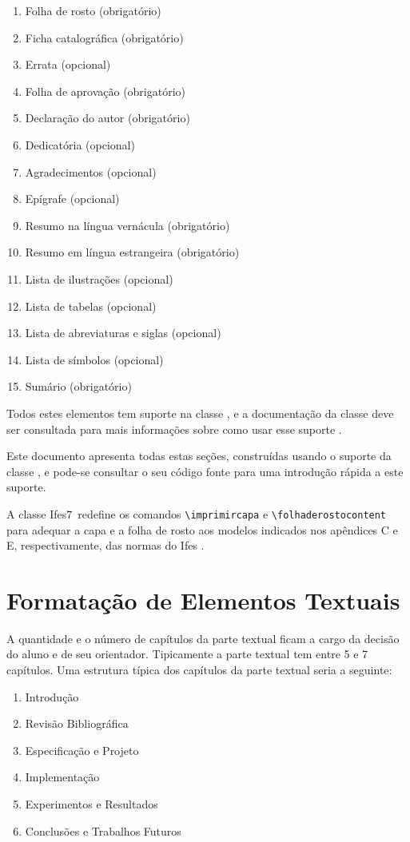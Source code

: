 \documentclass[times,english,brazil,oneside]{ifes8}
\newcommand{\ifestex}{\textsf{Ifes$7$}}
\begin{document}
\begin{enumerate}
\item Folha de rosto (obrigatório)
\item Ficha catalográfica (obrigatório)
\item Errata (opcional)
\item Folha de aprovação (obrigatório)
\item Declaração do autor (obrigatório)
\item Dedicatória (opcional)
\item Agradecimentos (opcional)
\item Epígrafe (opcional)
\item Resumo na língua vernácula (obrigatório)
\item Resumo em língua estrangeira (obrigatório)
\item Lista de ilustrações (opcional)
\item Lista de tabelas (opcional)
\item Lista de abreviaturas e siglas (opcional)
\item Lista de símbolos (opcional)
\item Sumário (obrigatório)
\end{enumerate}

Todos estes elementos tem suporte na classe \abnTeX, e a documentação
da classe deve ser consultada para mais informações sobre como usar
esse suporte \cite{Araujo2016}.

Este documento apresenta todas estas seções, construídas usando o
suporte da classe \abnTeX, e pode-se consultar o seu código fonte para
uma introdução rápida a este suporte.

A classe \ifestex\ redefine os comandos \verb!\imprimircapa! e
\verb!\folhaderostocontent! para adequar a capa e a folha de rosto aos
modelos indicados nos apêndices C e E, respectivamente, das normas do
Ifes \cite{Ifes2014}.



\chapter{Formatação de Elementos Textuais}
\label{cha:format-text}

A quantidade e o número de capítulos da parte textual ficam a cargo da
decisão do aluno e de seu orientador. Tipicamente a parte textual tem
entre 5 e 7 capítulos. Uma estrutura típica dos capítulos da parte
textual seria a seguinte:

\begin{SingleSpace}
  \begin{enumerate}
  \item Introdução
  \item Revisão Bibliográfica
  \item Especificação e Projeto
  \item Implementação
  \item Experimentos e Resultados
  \item Conclusões e Trabalhos Futuros
  \end{enumerate}
\end{SingleSpace}
\end{document}
